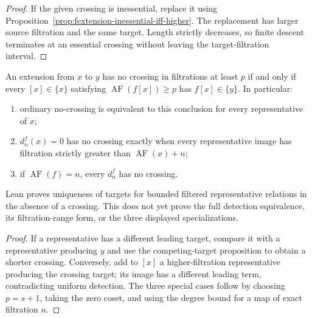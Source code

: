 \begin{proof}
  If the given crossing is inessential, replace it using
  Proposition~\ref{prop:fextension-inessential-iff-higher}.  The replacement
  has larger source filtration and the same target.  Length strictly
  decreases, so finite descent terminates at an essential crossing without
  leaving the target-filtration interval.
\end{proof}

\begin{proposition}
  \label{prop:no-crossing-iff-uniform-detection}
  \notready
  An extension from $x$ to $y$ has no crossing in filtrations at least $p$ if
  and only if every $[x]\in\{x\}$ satisfying
  $\operatorname{AF}(f[x])\ge p$ has $f[x]\in\{y\}$.  In particular:
  \begin{enumerate}
    \item ordinary no-crossing is equivalent to this conclusion for every
      representative of $x$;
    \item $d_n^f(x)=0$ has no crossing exactly when every representative image
      has filtration strictly greater than $\operatorname{AF}(x)+n$;
    \item if $\operatorname{AF}(f)=n$, every $d_n^f$ has no crossing.
  \end{enumerate}
  Lean proves uniqueness of targets for bounded filtered representative
  relations in the absence of a crossing.  This does not yet prove the full
  detection equivalence, its filtration-range form, or the three displayed
  specializations.
\end{proposition}

\begin{proof}
  If a representative has a different leading target, compare it with a
  representative producing $y$ and use the competing-target proposition to
  obtain a shorter crossing.  Conversely, add to $[x]$ a higher-filtration
  representative producing the crossing target; its image has a different
  leading term, contradicting uniform detection.  The three special cases
  follow by choosing $p=s+1$, taking the zero coset, and using the degree bound
  for a map of exact filtration $n$.
\end{proof}

